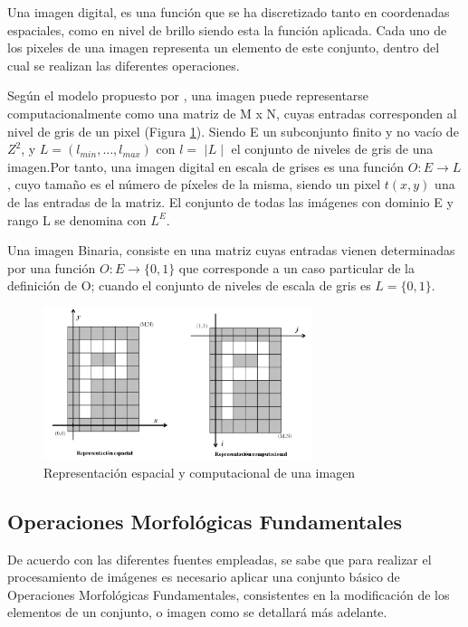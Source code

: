 \documentclass[12pt]{article}
\begin{document}
Una imagen digital, es una función que se ha discretizado tanto en coordenadas espaciales, como en nivel de brillo siendo esta la función aplicada. Cada uno de los pixeles de una imagen representa un elemento de este conjunto, dentro del cual se realizan las diferentes operaciones.

Según el modelo propuesto por \cite{benalcazar2014aprendizaje}, una imagen puede representarse computacionalmente como una matriz de M x N, cuyas entradas corresponden al nivel de gris de un pixel (Figura \ref{f1}). Siendo E un subconjunto  finito y no vacío de $Z^2$, y $L = (l_{min},...,l_{max})$ con $l=$ $ \mid L \mid $ el conjunto de niveles de gris de una imagen.Por tanto, una imagen digital en escala de grises es una función $O: E \rightarrow L$, cuyo tamaño es el número de píxeles de la misma, siendo un pixel $t(x,y)$ una de las entradas de la matriz. El conjunto de todas las imágenes con dominio E y rango L se denomina con $L^E$.

Una imagen Binaria, consiste en una matriz cuyas entradas vienen determinadas por una función $O: E \rightarrow \{0,1\}$ que corresponde a un caso particular de la definición de O; cuando el conjunto de niveles de escala de gris es $L = \{0,1 \} $.

\begin{figure}[htb]
\centering
\includegraphics[width=0.7\textwidth]{g1}
\caption{Representación espacial y computacional de una imagen \cite{benalcazar2014aprendizaje}} \label{f1}
\end{figure}


\subsection{\color{Black}Operaciones Morfológicas Fundamentales}
\justifying

De acuerdo con las diferentes fuentes empleadas, se sabe que para realizar el procesamiento de imágenes es necesario aplicar una conjunto básico de Operaciones Morfológicas Fundamentales, consistentes en la modificación de los elementos de un conjunto, o imagen como se detallará más adelante.
\end{document}
